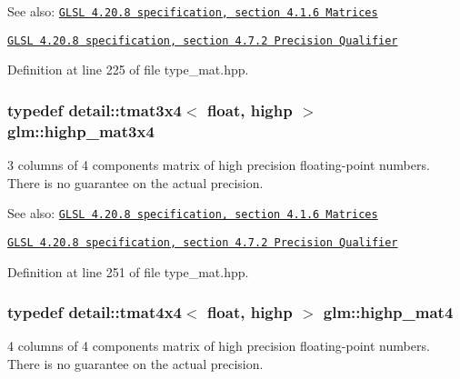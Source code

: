 \begin{Desc}
\item[See also:]\href{http://www.opengl.org/registry/doc/GLSLangSpec.4.20.8.pdf}{\tt GLSL 4.20.8 specification, section 4.1.6 Matrices} 

\href{http://www.opengl.org/registry/doc/GLSLangSpec.4.20.8.pdf}{\tt GLSL 4.20.8 specification, section 4.7.2 Precision Qualifier} \end{Desc}


Definition at line 225 of file type\_\-mat.hpp.\hypertarget{group__core__precision_gbaf9c8dd35db715b1093042703f879d0}{
\subsubsection[highp\_\-mat3x4]{\setlength{\rightskip}{0pt plus 5cm}typedef detail::tmat3x4$<$ float, highp $>$ {\bf glm::highp\_\-mat3x4}}}
\label{group__core__precision_gbaf9c8dd35db715b1093042703f879d0}


3 columns of 4 components matrix of high precision floating-point numbers. There is no guarantee on the actual precision.

\begin{Desc}
\item[See also:]\href{http://www.opengl.org/registry/doc/GLSLangSpec.4.20.8.pdf}{\tt GLSL 4.20.8 specification, section 4.1.6 Matrices} 

\href{http://www.opengl.org/registry/doc/GLSLangSpec.4.20.8.pdf}{\tt GLSL 4.20.8 specification, section 4.7.2 Precision Qualifier} \end{Desc}


Definition at line 251 of file type\_\-mat.hpp.\hypertarget{group__core__precision_g3067b3b8ce793227a51b2e3c233257d5}{
\subsubsection[highp\_\-mat4]{\setlength{\rightskip}{0pt plus 5cm}typedef detail::tmat4x4$<$ float, highp $>$ {\bf glm::highp\_\-mat4}}}
\label{group__core__precision_g3067b3b8ce793227a51b2e3c233257d5}


4 columns of 4 components matrix of high precision floating-point numbers. There is no guarantee on the actual precision.


